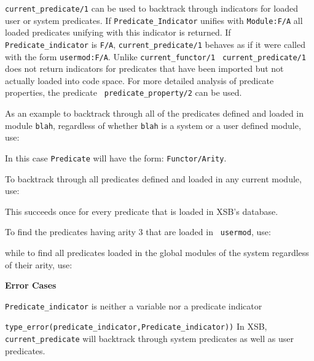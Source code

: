 \begin{description}
%
{\tt current\_predicate/1} can be used to backtrack through indicators
for loaded user or system predicates.  If {\tt Predicate\_Indicator}
unifies with {\tt Module:F/A} all loaded predicates unifying with this
indicator is returned.  If {\tt Predicate\_indicator} is {\tt F/A},
{\tt current\_predicate/1} behaves as if it were called with the form
{\tt usermod:F/A}.  Unlike {\tt current\_functor/1} {\tt
current\_predicate/1} does not return indicators for predicates that
have been imported but not actually loaded into code space.  For more
detailed analysis of predicate properties, the predicate {\tt
predicate\_property/2} can be used.

As an example to backtrack through all of the predicates defined and
loaded in module {\tt blah}, regardless of whether {\tt blah} is a
system or a user defined module, use:


    In this case {\tt Predicate} will have the form: {\tt Functor/Arity}.

    To backtrack through all predicates defined and loaded in any current 
    module, use:


    This succeeds once for every predicate that is loaded in XSB's
    database.

    To find the predicates having arity 3 that are loaded in {\tt
    usermod}, use:


    while to find all predicates loaded in the global modules of the system
    regardless of their arity, use:

%

\noindent
{\bf Error Cases}
\bi
\item 	{\tt Predicate\_indicator} is neither a variable nor a predicate indicator
\bi
\item 	{\tt type\_error(predicate\_indicator,Predicate\_indicator))}
\ei
\ei
%
\compatibility
%
In XSB, {\tt current\_predicate} will backtrack through system
predicates as well as user predicates.



\end{description}
